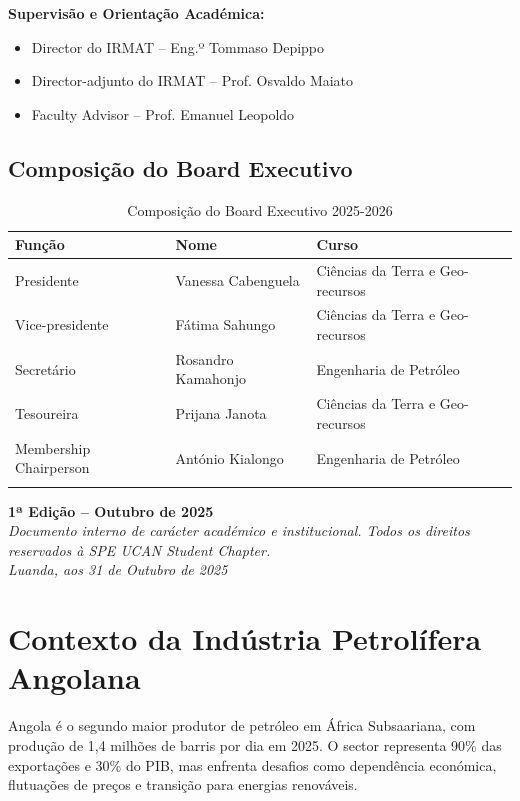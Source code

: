 \documentclass[12pt]{article}
\begin{document}
\noindent\textbf{Supervisão e Orientação Académica:}
\begin{itemize}
    \item Director do IRMAT -- Eng.º Tommaso Depippo
    \item Director-adjunto do IRMAT -- Prof. Osvaldo Maiato
    \item Faculty Advisor -- Prof. Emanuel Leopoldo
\end{itemize}

\subsection{Composição do Board Executivo}

\begin{center}
\begin{longtable}{|p{3cm}|p{4cm}|p{4cm}|}
\hline
\textbf{Função} & \textbf{Nome} & \textbf{Curso} \\
\hline
Presidente & Vanessa Cabenguela & Ciências da Terra e Geo-recursos \\
Vice-presidente & Fátima Sahungo & Ciências da Terra e Geo-recursos \\
Secretário & Rosandro Kamahonjo & Engenharia de Petróleo \\
Tesoureira & Prijana Janota & Ciências da Terra e Geo-recursos \\
Membership Chairperson & António Kialongo & Engenharia de Petróleo \\
\hline
\caption{Composição do Board Executivo 2025-2026}
\end{longtable}
\end{center}

\noindent\textbf{1ª Edição -- Outubro de 2025}\\
\textit{Documento interno de carácter académico e institucional. Todos os direitos reservados à SPE UCAN Student Chapter.}\\
\textit{Luanda, aos 31 de Outubro de 2025}

\newpage

\section{Contexto da Indústria Petrolífera Angolana}

Angola é o segundo maior produtor de petróleo em África Subsaariana, com produção de 1,4 milhões de barris por dia em 2025. O sector representa 90\% das exportações e 30\% do PIB, mas enfrenta desafios como dependência económica, flutuações de preços e transição para energias renováveis.
\end{document}
